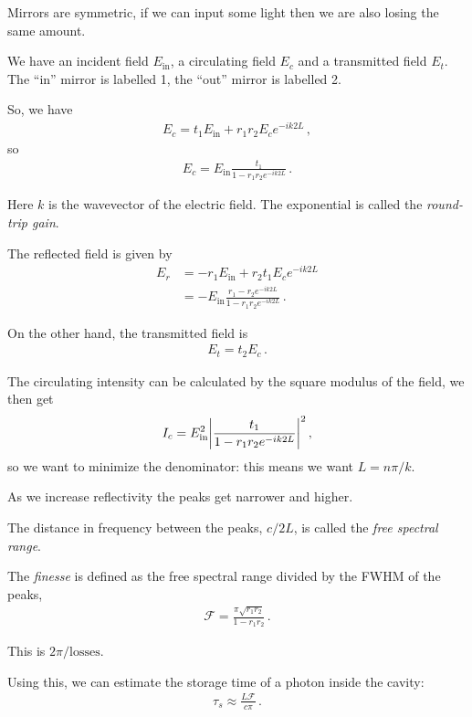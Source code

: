 \documentclass[main.tex]{subfiles}
\begin{document}
Mirrors are symmetric, if we can input some light then we are also losing the same amount.

We have an incident field \(E _{\text{in}}\), a circulating field \(E_{c}\) and a transmitted field \(E_{t}\). The ``in'' mirror is labelled 1, the ``out'' mirror is labelled 2. 

So, we have 
%
\begin{align}
E_{c} = t_1 E _{\text{in}} + r_1 r_2 E_{c} e^{-ik 2L} 
\,,
\end{align}
%
so 
%
\begin{align}
E_{c} = E _{\text{in}} \frac{t_1 }{1 - r_1 r_2 e^{-ik2L}}
\,.
\end{align}

Here \(k\) is the wavevector of the electric field. The exponential is called the \emph{round-trip gain}. 

The reflected field is given by 
%
\begin{subequations}
\begin{align}
E_{r} &= -r_1 E _{\text{in}} + r_2 t_1 E_{c} e^{-ik2L}  \\
&= -E _{\text{in}} \frac{r_1 - r_2 e^{-ik 2L}}{1 - r_1 r_2 e^{-ik2L}}
\,.
\end{align}
\end{subequations}

On the other hand, the transmitted field is 
%
\begin{align}
E_{t} = t_2 E_c 
\,.
\end{align}

The circulating intensity can be calculated by the square modulus of the field, we then get 
%
\begin{align}
I_{c} = E^2 _{\text{in}} \abs{\frac{t_1 }{1 - r_1 r_2 e^{-ik2L}}}^2
\,,
\end{align}
%
so we want to minimize the denominator: this means we want \(L = n \pi / k\). 

As we increase reflectivity the peaks get narrower and higher. 

The distance in frequency between the peaks, \(c / 2L\), is called the \emph{free spectral range}. 

The \emph{finesse} is defined as the free spectral range divided by the FWHM of the peaks, 
%
\begin{align}
\mathcal{F} = \frac{\pi \sqrt{r_1 r_2 }}{1 - r_1 r_2 }
\,.
\end{align}

This is \(2 \pi  / \text{losses}\).

Using this, we can estimate the storage time of a photon inside the cavity: 
%
\begin{align}
\tau_{s} \approx \frac{L \mathcal{F}}{c \pi }
\,.
\end{align}
\end{document}
